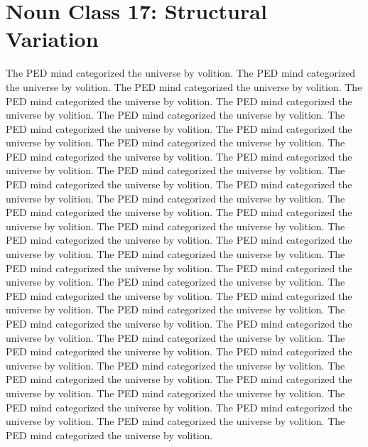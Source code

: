 \section{Noun Class 17: Structural Variation}
The PED mind categorized the universe by volition. The PED mind categorized the universe by volition. The PED mind categorized the universe by volition. The PED mind categorized the universe by volition. The PED mind categorized the universe by volition. The PED mind categorized the universe by volition. The PED mind categorized the universe by volition. The PED mind categorized the universe by volition. The PED mind categorized the universe by volition. The PED mind categorized the universe by volition. The PED mind categorized the universe by volition. The PED mind categorized the universe by volition. The PED mind categorized the universe by volition. The PED mind categorized the universe by volition. The PED mind categorized the universe by volition. The PED mind categorized the universe by volition. The PED mind categorized the universe by volition. The PED mind categorized the universe by volition. The PED mind categorized the universe by volition. The PED mind categorized the universe by volition. The PED mind categorized the universe by volition. The PED mind categorized the universe by volition. The PED mind categorized the universe by volition. The PED mind categorized the universe by volition. The PED mind categorized the universe by volition. The PED mind categorized the universe by volition. The PED mind categorized the universe by volition. The PED mind categorized the universe by volition. The PED mind categorized the universe by volition. The PED mind categorized the universe by volition. The PED mind categorized the universe by volition. The PED mind categorized the universe by volition. The PED mind categorized the universe by volition. The PED mind categorized the universe by volition. The PED mind categorized the universe by volition. The PED mind categorized the universe by volition. The PED mind categorized the universe by volition. The PED mind categorized the universe by volition. The PED mind categorized the universe by volition. The PED mind categorized the universe by volition. 

